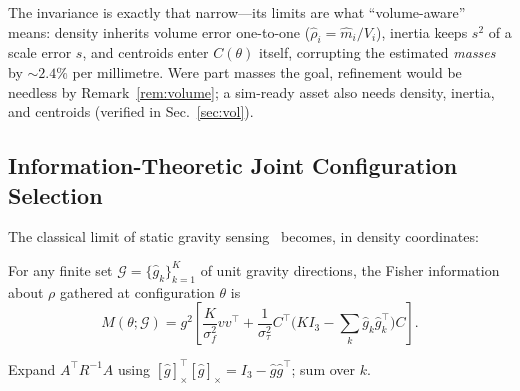 The invariance is exactly that narrow---its limits are what ``volume-aware''
means: density inherits volume error one-to-one
($\hat\rho_i=\hat m_i/V_i$), inertia keeps $s^2$ of a scale error $s$, and
centroids enter $C(\theta)$ itself, corrupting the estimated \emph{masses}
by ${\sim}2.4\%$ per millimetre. Were part masses the goal, refinement would
be needless by Remark~\ref{rem:volume}; a sim-ready asset also needs
density, inertia, and centroids (verified in Sec.~\ref{sec:vol}).

\subsection{Information-Theoretic Joint Configuration Selection}
\label{sec:theory}\label{sec:design}

The classical limit of static gravity
sensing~\cite{atkeson1986estimation} becomes, in density coordinates:

\begin{lemma}
\label{lem:closed}
For any finite set $\mathcal{G}=\{\hat g_k\}_{k=1}^{K}$ of unit gravity
directions, the Fisher information about $\rho$ gathered at configuration
$\theta$ is
\begin{equation}
M(\theta;\mathcal{G})=g^2\!\left[\frac{K}{\sigma_f^2}vv^{\!\top}
+\frac{1}{\sigma_\tau^2}C^{\!\top}\!\Big(KI_3-\!\sum_k\hat g_k\hat g_k^{\!\top}
\Big)C\right].
\label{eq:closed}
\end{equation}
\end{lemma}

\begin{IEEEproof}
Expand $A^{\!\top}R^{-1}A$ using
$[\hat g]_\times^{\!\top}[\hat g]_\times=I_3-\hat g\hat g^{\!\top}$; sum over
$k$.
\end{IEEEproof}

